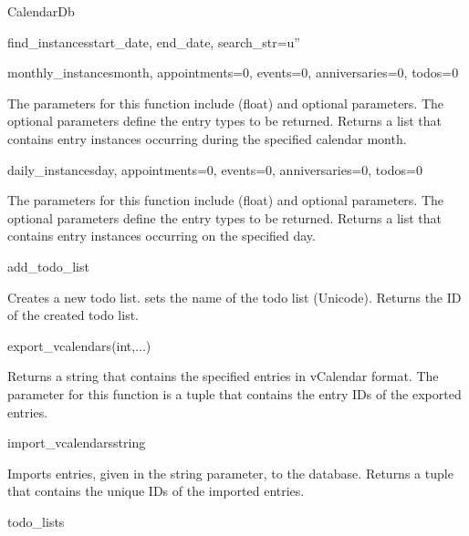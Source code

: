 \begin{classdesc*}{CalendarDb}
\begin{methoddesc}[CalendarDb]{find_instances}{start_date, end_date, search_str=u''}
\end{methoddesc}

\begin{methoddesc}[CalendarDb]{monthly_instances}{month, appointments=0, events=0, anniversaries=0, todos=0}

The parameters for this function include  (float) and 
optional parameters. The optional parameters define the entry types to be 
returned. Returns a list that contains entry instances occurring during the 
specified calendar month.

\end{methoddesc}

\begin{methoddesc}[CalendarDb]{daily_instances}{day, appointments=0, events=0, anniversaries=0, todos=0}

The parameters for this function include  (float) and 
optional parameters. The optional parameters define the entry types to be 
returned. Returns a list that contains entry instances occurring on the 
specified day.

\end{methoddesc}

\begin{methoddesc}[CalendarDb]{add_todo_list}{}

Creates a new todo list.  sets the name of the todo list 
(Unicode). Returns the ID of the created todo list.

\end{methoddesc}

\begin{methoddesc}[CalendarDb]{export_vcalendars}{(int,...)}

Returns a  string that contains the specified entries in 
vCalendar format. The parameter for this function is a tuple that contains 
the entry IDs of the exported entries.

\end{methoddesc}

\begin{methoddesc}[CalendarDb]{import_vcalendars}{string}

Imports  entries, given in the string parameter, to the 
database. Returns a tuple that contains the unique IDs of the imported 
entries.

\end{methoddesc}

\begin{memberdesc}[CalendarDb]{todo_lists}


\end{memberdesc}
\end{classdesc*}

